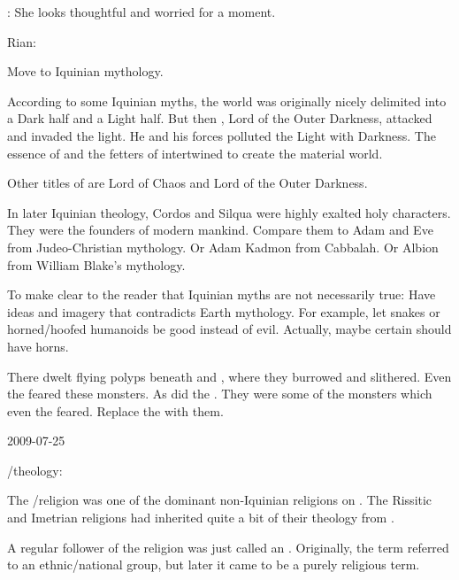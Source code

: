   \Criseis: 
  She looks thoughtful and worried for a moment.
  
  Rian: 
  

Move \Isphet to Iquinian mythology.

According to some Iquinian myths, the world was originally nicely delimited into a Dark half and a Light half. 
But then \Isphet, Lord of the Outer Darkness, attacked and invaded the light. 
He and his forces polluted the Light with Darkness. 
The essence of \iquin and the fetters of \itzach intertwined to create the material world. 

Other titles of \Isphet are Lord of Chaos and Lord of the Outer Darkness. 

In later Iquinian theology, Cordos and Silqua were highly exalted holy characters. 
They were the founders of modern mankind. 
Compare them to Adam and Eve from Judeo-Christian mythology.
Or Adam Kadmon from Cabbalah.
Or Albion from William Blake's mythology.



To make clear to the reader that Iquinian myths are not necessarily true: 
Have ideas and imagery that contradicts Earth mythology. 
For example, let snakes or horned/hoofed humanoids be good instead of evil. 
Actually, maybe certain \resphain should have horns. 


There dwelt flying polyps beneath \Nyx and \Erebos, where they burrowed and slithered.
Even the \banes feared these monsters.
As did the \resphain.
They were some of the monsters which even the \resphain feared. 
Replace the \ghobaleth with them. 



2009-07-25

\Rethyax/\Ortaican theology: 

  The \Ortaican/\rethyax religion was one of the dominant non-Iquinian religions on \Azmith.
  The Rissitic and Imetrian religions had inherited quite a bit of their theology from \Ortaica.

  A regular follower of the religion was just called an \Ortaican. 
  Originally, the term referred to an ethnic/national group, but later it came to be a purely religious term.

